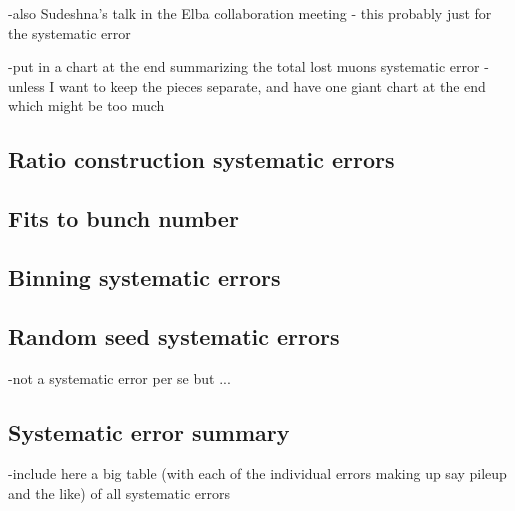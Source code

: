 -also Sudeshna's talk in the Elba collaboration meeting - this probably just for the systematic error






-put in a chart at the end summarizing the total lost muons systematic error - unless I want to keep the pieces separate, and have one giant chart at the end which might be too much



\subsection{Ratio construction systematic errors}
\label{sub:TimeShiftingParameters}



\subsection{Fits to bunch number}


\subsection{Binning systematic errors}

\subsection{Random seed systematic errors}

-not a systematic error per se but ... 

\subsection{Systematic error summary}

-include here a big table (with each of the individual errors making up say pileup and the like) of all systematic errors



\cleardoublepage






